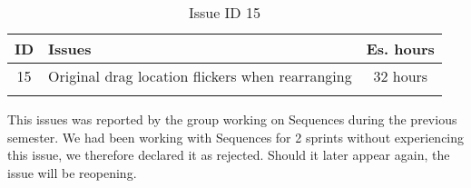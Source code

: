 \begin{longtable} { | c | p{12cm} | c | } 
\hline
	ID 	&	Issues	&		 Es. hours \\\hline
	15 	&	Original drag location flickers when rearranging	&	32 hours \\\hline
\caption{Issue ID 15}
\label{tab:spr2_flicker}
\end{longtable}

This issues was reported by the group working on Sequences during the previous semester. We had been working with Sequences for 2 sprints without experiencing this issue, we therefore declared it as rejected. Should it later appear again, the issue will be reopening. 